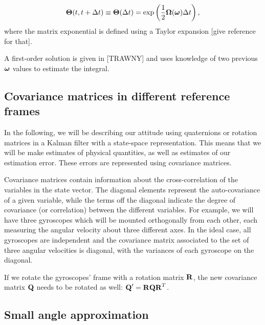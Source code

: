 \begin{equation}
\boldsymbol\Theta(t,t+\Delta t) \equiv \boldsymbol\Theta(\Delta t) = \exp\left(\frac{1}{2}\boldsymbol\Omega(\boldsymbol\omega)\Delta t\right),
\label{eq:quaternionIntegration}
\end{equation}
where the matrix exponential is defined using a Taylor expansion [give reference for that]. 


A first-order solution is given in [TRAWNY] and uses knowledge of two previous $\boldsymbol\omega$ values to estimate the integral.

\subsection{Covariance matrices in different reference frames}
In the following, we will be describing our attitude using quaternions or rotation matrices in a Kalman filter with a state-space representation. This means that we will be make estimates of physical quantities, as well as estimates of our estimation error. These errors are represented using covariance matrices. 

Covariance matrices contain information about the cross-correlation of the variables in the state vector. The diagonal elements represent the auto-covariance of a given variable, while the terms off the diagonal indicate the degree of covariance (or correlation) between the different variables. For example, we will have three gyroscopes which will be mounted orthogonally from each other, each measuring the angular velocity about three different axes. In the ideal case, all gyroscopes are independent and the covariance matrix associated to the set of three angular velocities is diagonal, with the variances of each gyroscope on the diagonal.

If we rotate the gyroscopes' frame with a rotation matrix $\textrm{\textbf{R}}$, the new covariance matrix $\textrm{\textbf{Q}}$ needs to be rotated as well: $\textrm{\textbf{Q}}' = \textrm{\textbf{R}}\textrm{\textbf{Q}}\textrm{\textbf{R}}^T$. 

\subsection{Small angle approximation}

